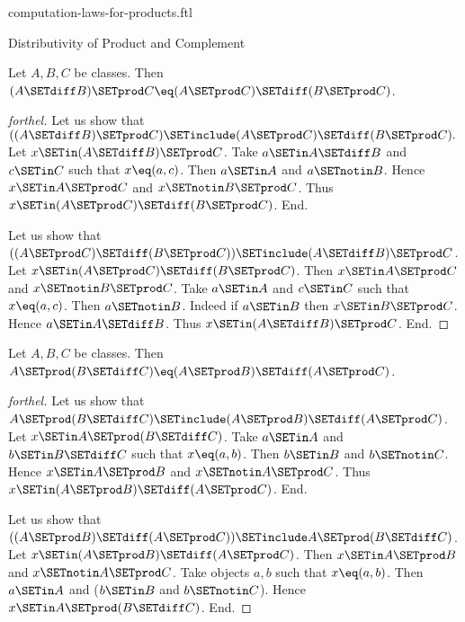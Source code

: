 \documentclass{stex}
\begin{document}
\begin{smodule}{computation-laws-for-products.ftl}
\begin{sfragment}{Distributivity of Product and Complement}
  \begin{proposition}[forthel,id=FOUNDATIONS_05_6495329908162560]
    Let $A, B, C$ be classes.
    Then $(A \SETdiff B) \SETprod C \eq (A \SETprod C) \SETdiff (B \SETprod C)$.
  \end{proposition}
  \begin{proof}[forthel]
    Let us show that $((A \SETdiff B) \SETprod C) \SETinclude (A \SETprod C) \SETdiff (B \SETprod C).$ %
      Let $x \SETin (A \SETdiff B) \SETprod C$.
      Take $a \SETin A \SETdiff B$ and $c \SETin C$ such that $x \eq (a, c)$.
      Then $a \SETin A$ and $a \SETnotin B$.
      Hence $x \SETin A \SETprod C$ and $x \SETnotin B \SETprod C$.
      Thus $x \SETin (A \SETprod C) \SETdiff (B \SETprod C)$.
    End.

    Let us show that $((A \SETprod C) \SETdiff (B \SETprod C)) \SETinclude (A \SETdiff B) \SETprod C$. %
      Let $x \SETin (A \SETprod C) \SETdiff (B \SETprod C)$.
      Then $x \SETin A \SETprod C$ and $x \SETnotin B \SETprod C$.
      Take $a \SETin A$ and $c \SETin C$ such that $x \eq (a, c)$.
      Then $a \SETnotin B$.
      Indeed if $a \SETin B$ then $x \SETin B \SETprod C$.
      Hence $a \SETin A \SETdiff B$.
      Thus $x \SETin (A \SETdiff B) \SETprod C$.
    End.
  \end{proof}

  \begin{proposition}[forthel,id=FOUNDATIONS_05_3195639422779392]
    Let $A, B, C$ be classes.
    Then $A \SETprod (B \SETdiff C) \eq (A \SETprod B) \SETdiff (A \SETprod C)$.
  \end{proposition}
  \begin{proof}[forthel]
    Let us show that $A \SETprod (B \SETdiff C) \SETinclude (A \SETprod B) \SETdiff (A \SETprod C)$.
      Let $x \SETin A \SETprod (B \SETdiff C)$.
      Take $a \SETin A$ and $b \SETin B \SETdiff C$ such that $x \eq (a, b)$.
      Then $b \SETin B$ and $b \SETnotin C$.
      Hence $x \SETin A \SETprod B$ and $x \SETnotin A \SETprod C$.
      Thus $x \SETin (A \SETprod B) \SETdiff (A \SETprod C)$.
    End.

    Let us show that $((A \SETprod B) \SETdiff (A \SETprod C)) \SETinclude A \SETprod (B \SETdiff C)$. %
      Let $x \SETin (A \SETprod B) \SETdiff (A \SETprod C)$.
      Then $x \SETin A \SETprod B$ and $x \SETnotin A \SETprod C$.
      Take objects $a, b$ such that $x \eq (a, b)$.
      Then $a \SETin A$ and ($b \SETin B$ and $b \SETnotin C$).
      Hence $x \SETin A \SETprod (B \SETdiff C)$.
    End.
  \end{proof}
\end{sfragment}


\end{smodule}
\end{document}
